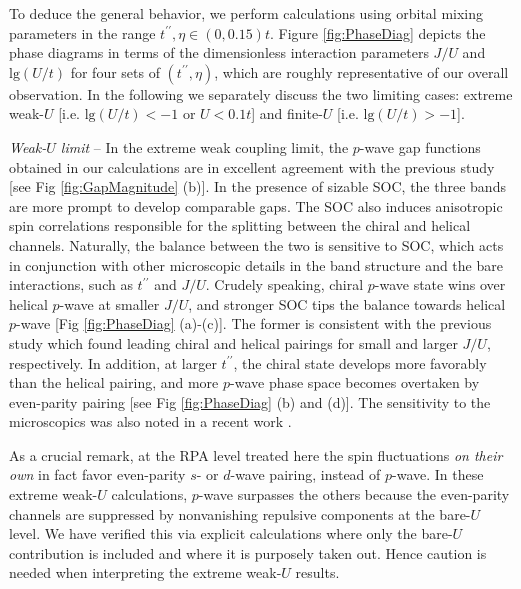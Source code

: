 \documentclass[aps,prl,twocolumn,superscriptaddress,showpacs]{revtex4-1}
\begin{document}
To deduce the general behavior, we perform calculations using orbital mixing parameters in the range $t^{\prime\prime},\eta \in (0,0.15)t$. Figure \ref{fig:PhaseDiag} depicts the phase diagrams in terms of the dimensionless interaction parameters $J/U$ and $\text{lg}(U/t)$ for four sets of $(t^{\prime\prime},\eta)$, which are roughly representative of our overall observation. In the following we separately discuss the two limiting cases: extreme weak-$U$ [i.e. $\text{lg}(U/t)<-1$ or $U<0.1t$] and finite-$U$ [i.e. $\text{lg}(U/t)>-1$].

{\it Weak-$U$ limit} -- In the extreme weak coupling limit, the $p$-wave gap functions obtained in our calculations are in excellent agreement with the previous study \cite{Scaffidi:14} [see Fig \ref{fig:GapMagnitude} (b)]. In the presence of sizable SOC, the three bands are more prompt to develop comparable gaps. The SOC also induces anisotropic spin correlations \cite{Ng:00,Eremin:02,Cobo:16} responsible for the splitting between the chiral and helical channels. Naturally, the balance between the two is sensitive to SOC, which acts in conjunction with other microscopic details in the band structure and the bare interactions, such as $t^{\prime\prime}$ and $J/U$. Crudely speaking, chiral $p$-wave state wins over helical $p$-wave at smaller $J/U$, and stronger SOC tips the balance towards helical $p$-wave [Fig \ref{fig:PhaseDiag} (a)-(c)]. The former is consistent with the previous study which found leading chiral and helical pairings for small and larger $J/U$, respectively. In addition, at larger $t^{\prime\prime}$, the chiral state develops more favorably than the helical pairing, and more $p$-wave phase space becomes overtaken by even-parity pairing [see Fig \ref{fig:PhaseDiag} (b) and (d)]. The sensitivity to the microscopics was also noted in a recent work \cite{Hsu:17}.

As a crucial remark, at the RPA level treated here the spin fluctuations {\it on their own} in fact favor even-parity $s$- or $d$-wave pairing, instead of $p$-wave. In these extreme weak-$U$ calculations, $p$-wave surpasses the others because the even-parity channels are suppressed by nonvanishing repulsive components at the bare-$U$ level. We have verified this via explicit calculations where only the bare-$U$ contribution is included and where it is purposely taken out. Hence caution is needed when interpreting the extreme weak-$U$ results.

\end{document}
